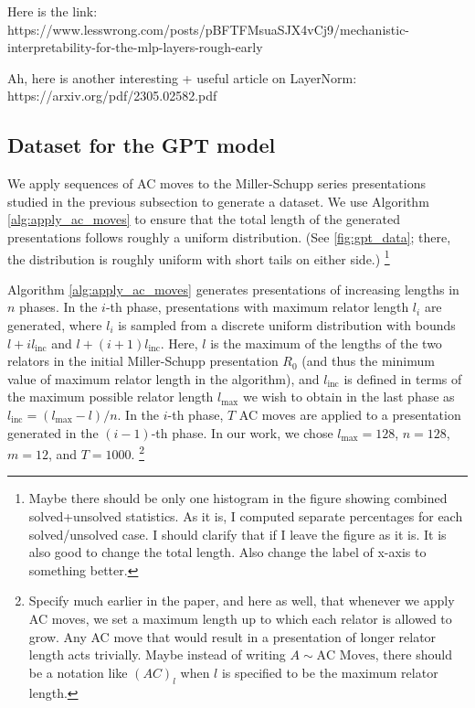 Here is the link: https://www.lesswrong.com/posts/pBFTFMsuaSJX4vCj9/mechanistic-interpretability-for-the-mlp-layers-rough-early

Ah, here is another interesting + useful article on LayerNorm: https://arxiv.org/pdf/2305.02582.pdf


\subsection{Dataset for the GPT model}

We apply sequences of AC moves to the Miller-Schupp series presentations studied in the previous subsection to generate a dataset.
We use Algorithm \autoref{alg:apply_ac_moves} to ensure that the total length of the generated presentations follows roughly a uniform distribution.
(See \autoref{fig:gpt_data}; there, the distribution is roughly uniform with short tails on either side.)
\footnote{Maybe there should be only one histogram in the figure showing combined solved+unsolved statistics.
As it is, I computed separate percentages for each solved/unsolved case.
I should clarify that if I leave the figure as it is.
It is also good to change the total length.
Also change the label of x-axis to something better.}

Algorithm \autoref{alg:apply_ac_moves} generates presentations of increasing lengths in $n$ phases.
In the $i$-th phase, presentations with maximum relator length $l_i$ are generated, where $l_i$ is sampled from a discrete uniform distribution with bounds $l + i l_{\text{inc}} $ and $l + (i+1) l_{\text{inc}}$.
Here, $l$ is the maximum of the lengths of the two relators in the initial Miller-Schupp presentation $R_0$ (and thus the minimum value of maximum relator length in the algorithm), and $l_{\text{inc}}$ is defined in terms of the maximum possible relator length $l_{\text{max}}$ we wish to obtain in the last phase as $l_{\text{inc}} = (l_{\text{max}}-l)/n$.
In the $i$-th phase, $T$ AC moves are applied to a presentation generated in the $(i-1)$-th phase.
In our work, we chose $l_{\text{max}}=128$, $n=128$, $m=12$, and $T=1000$.
\footnote{Specify much earlier in the paper, and here as well, that whenever we apply AC moves, we set a maximum length up to which each relator is allowed to grow.
Any AC move that would result in a presentation of longer relator length acts trivially.
Maybe instead of writing $A \sim \text{AC Moves}$, there should be a notation like $(AC)_l$ when $l$ is specified to be the maximum relator length.}

